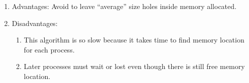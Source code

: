 \documentclass[13pt,a4paper]{article}
\begin{document}
\begin{enumerate}[$\ast$]
				\begin{enumerate}[$\bullet$]
					\item Advantages: Avoid to leave “average” size holes inside memory allocated.
					\item Disadvantages:
						\begin{enumerate}[-]
							\item This algorithm is so slow because it takes time to find memory location for each process.
							\item Later processes must wait or lost even though there is still free memory location.
						\end{enumerate}
				\end{enumerate}
		\end{enumerate}
\end{document}
